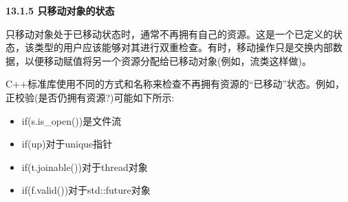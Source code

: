 \hspace*{\fill} \par %
\textbf{13.1.5 只移动对象的状态}

只移动对象处于已移动状态时，通常不再拥有自己的资源。这是一个已定义的状态，该类型的用户应该能够对其进行双重检查。有时，移动操作只是交换内部数据，以便移动赋值将另一个资源分配给已移动对象(例如，流类这样做)。\par

C++标准库使用不同的方式和名称来检查不再拥有资源的“已移动”状态。例如，正校验(是否仍拥有资源?)可能如下所示:\par

\begin{itemize}
	\item if(s.is\_open())是文件流
	\item if(up)对于unique指针
	\item if(t.joinable())对于thread对象
	\item if(f.valid())对于std::future对象
\end{itemize}














